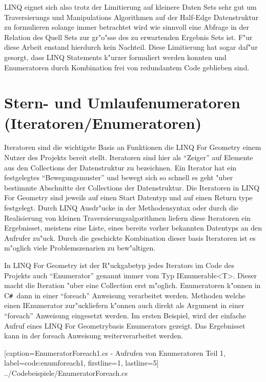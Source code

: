 \documentclass[pagesize, paper=a4, fontsize=12pt,titlepage=true, headings=small, headnosepline, abstractoff, liststotoc, nochapterprefix, plainheadsepline]{scrreprt}
\newcommand{\CSS}{C\texttt{\# }}
\newcommand{\LFG}{LINQ For Geometry}
\newcommand{\LFGS}{LINQ For Geometry }
\newcommand{\HES}{Half-Edge Datenstruktur }
\begin{document}
LINQ eignet sich also trotz der Limitierung auf kleinere Daten Sets sehr gut um Traversierungs und Manipulations Algorithmen auf der \HES zu formulieren solange immer betrachtet wird wie sinnvoll eine Abfrage in der Relation des Quell Sets zur gr"o"sse des zu erwartenden Ergebnis Sets ist. F"ur diese Arbeit enstand hierdurch kein Nachteil. Diese Limitierung hat sogar daf"ur gesorgt, dass LINQ Statements k"urzer formuliert werden konnten und Enumeratoren durch Kombination frei von redundantem Code geblieben sind.
	\section {Stern- und Umlaufenumeratoren (Iteratoren/Enumeratoren) \label{part:iteratoren}}
		Iteratoren sind die wichtigste Basis an Funktionen die \LFGS einem Nutzer des Projekts bereit stellt. Iteratoren sind hier als "`Zeiger"' auf Elemente aus den Collections der Datenstruktur zu bezeichnen. Ein Iterator hat ein festgelegtes "`Bewegungsmuster"' und bewegt sich so schnell es geht "uber bestimmte Abschnitte der Collections der Datenstruktur. Die Iteratoren in \LFGS sind jeweils auf einen Start Datentyp und auf einen Return type festgelegt. Durch LINQ Ausdr"ucke in der Methodensyntax oder durch die Realisierung von kleinen Traversierungsalgorithmen liefern diese Iteratoren ein Ergebnisset, meistens eine Liste, eines bereits vorher bekannten Datentyps an den Aufrufer zu"uck. Durch die geschickte Kombination dieser basis Iteratoren ist es m"oglich viele Problemszenarien zu bew"altigen.

In \LFGS ist der R"uckgabetyp jedes Iterators im Code des Projekts auch "`Enumerator"' genannt immer vom Typ IEnumerable<T>. Dieser macht die Iteration "uber eine Collection erst m"oglich. Enumeratoren k"onnen in \CSS dann in einer "`foreach"' Anweisung verarbeitet werden. Methoden welche einen IEnumerator zur"uckliefern k"onnen auch direkt als Argument in einer "`foreach"' Anweisung eingesetzt werden.
Im ersten Beispiel, wird der einfache Aufruf eines \LFG basis Enumerators gezeigt. Das Ergebnisset kann in der foreach Anweisung weiterverarbeitet werden.


			[caption={EnumeratorForeach1.cs - Aufrufen von Enumeratoren Teil 1}, label=code:enumforeach1, firstline=1, lastline=5]
			{../Codebeispiele/EnumeratorForeach.cs}
\end{document}
